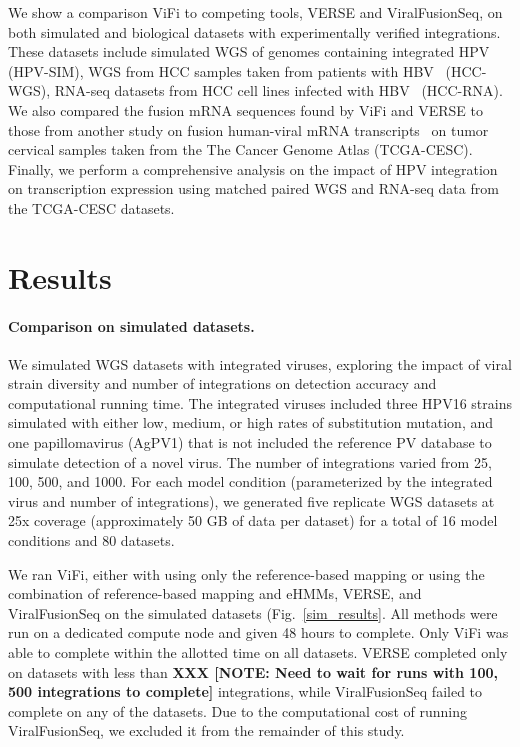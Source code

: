 \documentclass[10pt]{article}
\begin{document}
We show a comparison ViFi to competing tools, VERSE and ViralFusionSeq, on both simulated and biological datasets with experimentally verified integrations.  These datasets include simulated WGS of genomes containing integrated HPV (HPV-SIM), WGS from HCC samples taken from patients with HBV~\cite{Sung2012} (HCC-WGS), RNA-seq datasets from HCC cell lines infected with HBV~\cite{Lau2014} (HCC-RNA).  We also compared the fusion mRNA sequences found by ViFi and VERSE to those from another study on fusion human-viral mRNA transcripts~\cite{Tang2013} on tumor cervical samples taken from the The Cancer Genome Atlas (TCGA-CESC).  Finally, we perform a comprehensive analysis on the impact of HPV integration on transcription expression using matched paired WGS and RNA-seq data from the TCGA-CESC datasets.  

\section*{Results}

\paragraph{\textbf{Comparison on simulated datasets.}}  We simulated WGS datasets with integrated viruses, exploring the impact of viral strain diversity and number of integrations on detection accuracy and computational running time.  The integrated viruses included three HPV16 strains simulated with either low, medium, or high rates of substitution mutation, and one papillomavirus (AgPV1) that is not included the reference PV database to simulate detection of a novel virus.  The number of integrations varied from 25, 100, 500, and 1000.  For each model condition (parameterized by the integrated virus and number of integrations), we generated five replicate WGS datasets at 25x coverage (approximately 50 GB of data per dataset) for a total of 16 model conditions and 80 datasets.  

We ran ViFi, either with using only the reference-based mapping or using the combination of reference-based mapping and eHMMs, VERSE, and ViralFusionSeq on the simulated datasets (Fig.~\ref{sim_results}.  All methods were run on a dedicated compute node and given 48 hours to complete.  Only ViFi was able to complete within the allotted time on all datasets. VERSE completed only on datasets with less than \textbf{XXX [NOTE:  Need to wait for runs with 100, 500 integrations to complete]} integrations, while ViralFusionSeq failed to complete on any of the datasets.  Due to the computational cost of running ViralFusionSeq, we excluded it from the remainder of this study.
\end{document}
